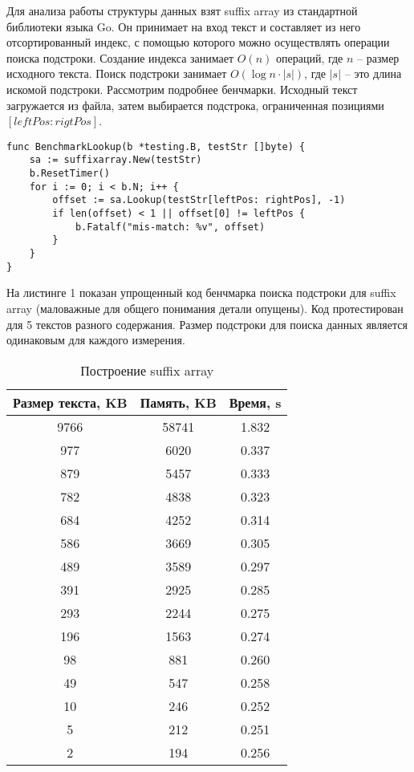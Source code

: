 
Для анализа работы структуры данных взят suffix array из стандартной библиотеки языка Go. \cite{golang2016sa}
Он принимает на вход текст и составляет из него отсортированный индекс, с помощью которого можно осуществлять
операции поиска подстроки. Создание индекса занимает $O(n)$ операций, где $n$ -- размер исходного текста.
Поиск подстроки занимает $O(\log n \cdot |s|)$, где $|s|$ -- это длина искомой подстроки.
Рассмотрим подробнее бенчмарки. Исходный текст загружается из файла, затем выбирается подстрока,
ограниченная позициями $[leftPos:rigtPos]$.

\begin{lstlisting}[caption=Suffix array example]
func BenchmarkLookup(b *testing.B, testStr []byte) {
    sa := suffixarray.New(testStr)
    b.ResetTimer()
    for i := 0; i < b.N; i++ {
        offset := sa.Lookup(testStr[leftPos: rightPos], -1)
        if len(offset) < 1 || offset[0] != leftPos {
            b.Fatalf("mis-match: %v", offset)
        }
    }
}
\end{lstlisting}

На листинге 1 показан упрощенный код бенчмарка поиска подстроки для suffix array
(маловажные для общего понимания детали опущены). Код протестирован для 5 текстов разного содержания.
Размер подстроки для поиска данных является одинаковым для каждого измерения.

\begin{table}[h!]
    \centering
    \begin{tabular}{|c|c|c|}
        \hline
        Размер текста, KB & Память, KB & Время, s\\
        \hline
        9766 & 58741 & 1.832\\
        \hline
        977 & 6020 & 0.337\\
        \hline
        879 & 5457 & 0.333\\
        \hline
        782 & 4838 & 0.323\\
        \hline
        684 & 4252 & 0.314\\
        \hline
        586 & 3669 & 0.305\\
        \hline
        489 & 3589 & 0.297\\
        \hline
        391 & 2925 & 0.285\\
        \hline
        293 & 2244 & 0.275\\
        \hline
        196 & 1563 & 0.274\\
        \hline
        98 & 881 & 0.260\\
        \hline
        49 & 547 & 0.258\\
        \hline
        10 & 246 & 0.252\\
        \hline
        5 & 212 & 0.251\\
        \hline
        2 & 194 & 0.256\\
        \hline
    \end{tabular}
    \caption{Построение suffix array}
    \label{table:2}
\end{table}

